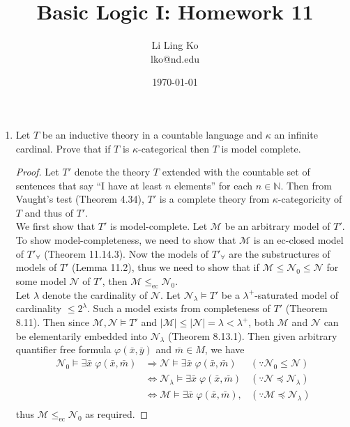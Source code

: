 \documentclass{article}
\begin{document}
\title{Basic Logic I: Homework 11}
\author{Li Ling Ko\\ lko@nd.edu}
\date{\today}
\maketitle

\begin{enumerate}[label={\bf Q\arabic*:}]
  \item Let $T$ be an inductive theory in a countable language and $\kappa$
    an infinite cardinal. Prove that if $T$ is $\kappa$-categorical then
    $T$ is model complete.

    \begin{proof}
      Let $T'$ denote the theory $T$ extended with the countable set of
      sentences that say ``I have at least $n$ elements'' for each
      $n\in\mathbb{N}$. Then from Vaught's test (Theorem 4.34), $T'$ is a
      complete theory from $\kappa$-categoricity of $T$ and thus of $T'$. \\

      We first show that $T'$ is model-complete. Let $\mathcal{M}$ be an
      arbitrary model of $T'$. To show model-completeness, we need to show
      that $\mathcal{M}$ is an ec-closed model of $T'_\forall$ (Theorem
      11.14.3). Now the models of $T'_\forall$ are the substructures of
      models of $T'$ (Lemma 11.2), thus we need to show that if
      $\mathcal{M}\leq \mathcal{N}_0\leq\mathcal{N}$ for some model
      $\mathcal{N}$ of $T'$, then
      $\mathcal{M}\leq_{\text{ec}}\mathcal{N}_0$. \\

      Let $\lambda$ denote the cardinality of $\mathcal{N}$. Let
      $\mathcal{N}_\lambda\models T'$ be a $\lambda^+$-saturated model of
      cardinality $\leq2^\lambda$. Such a model exists from completeness of
      $T'$ (Theorem 8.11). Then since $\mathcal{M},\mathcal{N}\models T'$
      and $|\mathcal{M}|\leq|\mathcal{N}|=\lambda<\lambda^+$, both
      $\mathcal{M}$ and $\mathcal{N}$ can be elementarily embedded into
      $\mathcal{N}_\lambda$ (Theorem 8.13.1). Then given arbitrary quantifier
      free formula $\varphi(\bar{x},\bar{y})$ and $\bar{m}\in M$, we have
      \begin{align*}
        \mathcal{N}_0\models \exists\bar{x}\; \varphi(\bar{x},\bar{m})
          &\Rightarrow\mathcal{N}\models \exists\bar{x}\;
          \varphi(\bar{x},\bar{m}) &(\because \mathcal{N}_0\leq\mathcal{N})
          \\
          &\Leftrightarrow\mathcal{N}_\lambda\models \exists\bar{x}\;
            \varphi(\bar{x},\bar{m}) &(\because
            \mathcal{N}\preceq\mathcal{N}_\lambda) \\
          &\Leftrightarrow\mathcal{M}\models \exists\bar{x}\;
            \varphi(\bar{x},\bar{m}), &(\because
            \mathcal{M}\preceq\mathcal{N}_\lambda) \\
      \end{align*}
      thus $\mathcal{M}\leq_{\text{ec}}\mathcal{N}_0$ as required.
    \end{proof}


\end{enumerate}
\end{document}

